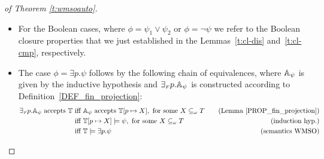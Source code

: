\begin{proof}[of Theorem \ref{t:wmsoauto}]
\begin{itemize}
\item
For the Boolean cases, where $\phi = \psi_1 \vee \psi_2$ or $\phi = \neg\psi$
we refer to the Boolean closure properties that we just established in the
Lemmas~\ref{t:cl-dis} and~\ref{t:cl-cmp},
respectively.

\item
The case $\phi = \exists p. \psi$ follows by the following chain of
equivalences, where $\mathbb{A}_{\psi}$ is given by the inductive hypothesis and
${\exists_{{\scriptscriptstyle F}} p}.\mathbb{A}_{\psi}$ is constructed according to
Definition~\ref{DEF_fin_projection}:
\begin{alignat*}{2}
{\finexists p}.\bbA_{\psi} \text{ accepts }\mb{T}
   & \text{ iff }
     \bbA_{\psi} \text{ accepts } \mb{T}[p \mapsto X],
     \text{ for some } X \sse_{\om} T
   & \quad\text{(Lemma~\ref{PROP_fin_projection})}
\\ & \text{ iff }
     \mb{T}[p \mapsto X] \models \psi,
     \text{ for some } X \sse_{\om} T
   & \quad\text{(induction hyp.)}
\\ & \text{ iff }
    \mb{T} \models \exists p. \psi
   & \quad\text{(semantics $\wmso$)}
\end{alignat*}
\end{itemize}
\end{proof}


